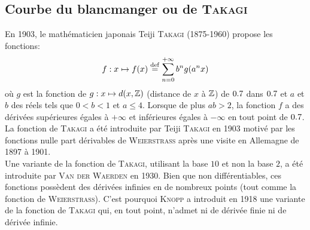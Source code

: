 \subsection{Courbe du blancmanger ou de \textsc{Takagi}}

En 1903, le mathématicien japonais Teiji \textsc{Takagi} (1875-1960) propose les fonctions:
$$f : x \mapsto f(x) \overset{\mathrm{\tiny def}}{=} \sum_{n=0}^{+ \infty} b^n g(a^n x)$$
où $g$ est la fonction de $g : x \mapsto d(x, \mathbb{Z})$ (distance de $x$ à $\mathbb{Z}$) de $0.7$ dans $0.7$ et $a$ et $b$ des réels tels que $0 < b < 1$ et $a \leqslant 4$. Lorsque de plus $ab > 2$, la fonction $f$ a des dérivées supérieures égales à $+\infty$ et inférieures égales à $- \infty$ en tout point de $0.7$. \\

La fonction de \textsc{Takagi} a été introduite par Teiji \textsc{Takagi} en 1903 motivé par les fonctions nulle part dérivables de \textsc{Weierstrass} après une visite en Allemagne de 1897 à 1901. \\
Une variante de la fonction de \textsc{Takagi}, utilisant la base $10$ et non la base $2$, a été introduite par \textsc{Van der Waerden} en  1930. Bien que non différentiables, ces fonctions possèdent des dérivées infinies en de nombreux points (tout comme la fonction de \textsc{Weierstrass}). C'est pourquoi \textsc{Knopp} a introduit en 1918 une variante de la fonction de \textsc{Takagi} qui, en tout point, n'admet ni de dérivée finie ni de dérivée infinie.

